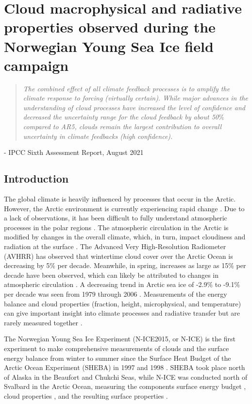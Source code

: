 \chapter{Cloud macrophysical and radiative properties observed during the Norwegian Young Sea Ice field campaign}
\vspace{1 cm}
\begin{spacing}{1} \begin{quote} 
\noindent \emph{The combined effect of all climate feedback processes is to amplify the climate response to forcing (virtually certain). While major advances in the understanding of cloud processes have increased the level of confidence and decreased the uncertainty range for the cloud feedback by about 50$\%$ compared to AR5, clouds remain the largest contribution to overall uncertainty in climate feedbacks (high confidence).} \end{quote}
\hspace{6 cm} - IPCC Sixth Assessment Report, August 2021  
\end{spacing}
\doublespacing
\section{Introduction}
The global climate is heavily influenced by processes that occur in the Arctic. However, the Arctic environment is currently experiencing rapid change \citep{overland:2011, stroeve:2007}. Due to a lack of observations, it has been difficult to fully understand atmospheric processes in the polar regions \citep{persson:2002}. The atmospheric circulation in the Arctic is modified by changes in the overall climate, which, in turn, impact cloudiness and radiation at the surface \citep{zhang:2008}. The Advanced Very High-Resolution Radiometer (AVHRR) has observed that wintertime cloud cover over the Arctic Ocean is decreasing by 5$\%$ per decade. Meanwhile, in spring, increases as large as 15$\%$ per decade have been observed, which can likely be attributed to changes in atmospheric circulation \citep{schweiger:2004}. A decreasing trend in Arctic sea ice of -2.9$\%$ to -9.1$\%$ per decade was seen from 1979 through 2006 \citep{stroeve:2007}. Measurements of the energy balance and cloud properties (fraction, height, microphysical, and temperature) can give important insight into climate processes and radiative transfer but are rarely measured together \citep{persson:2002, schweiger:2004, miller:2017}. 

The Norwegian Young Sea Ice Experiment (N-ICE2015, or N-ICE) \citep{granskog:2018} is the first experiment to make comprehensive measurements of clouds and the surface energy balance from winter to summer since the Surface Heat Budget of the Arctic Ocean Experiment (SHEBA) in 1997 and 1998 \citep{walden:2017, uttal:2002}. SHEBA took place north of Alaska in the Beaufort and Chukchi Seas, while N-ICE was conducted north of Svalbard in the Arctic Ocean, measuring the components surface energy budget \citep{persson:2002, andreas:2010, grachev:2007}, cloud properties \citep{turner:2005, turner:2002, intrieri:2002, shupe:2004}, and the resulting surface properties \citep{intrieri:2002, shupe:2004}. 

